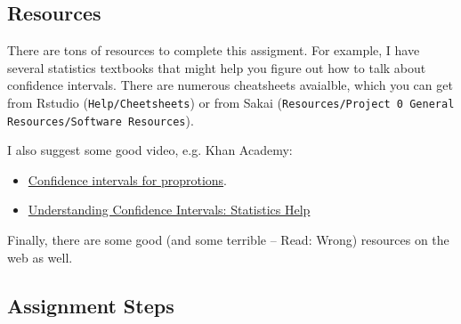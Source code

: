 \documentclass{tufte-handout}\usepackage[]{graphicx}\usepackage[]{color}
\begin{document}
\subsection{Resources}

There are tons of resources to complete this assigment. For example, I have several statistics textbooks that might help you figure out how to talk about confidence intervals. 
There are numerous cheatsheets avaialble, which you can get from Rstudio (\texttt{Help/Cheetsheets}) or from Sakai (\texttt{Resources/Project 0 General Resources/Software Resources}).

I also suggest some good video, e.g. Khan Academy:

\begin{itemize}
  \item \href{https://www.khanacademy.org/math/ap-statistics/estimating-confidence-ap/introduction-confidence-intervals/v/confidence-intervals-and-margin-of-error}{Confidence intervals for proprotions}.
  \item \href{https://www.youtube.com/watch?v=tFWsuO9f74o}{Understanding Confidence Intervals: Statistics Help}
\end{itemize}


Finally, there are some good (and some terrible -- Read: Wrong) resources on the web as well. 

\subsection{Assignment Steps}
\end{document}
